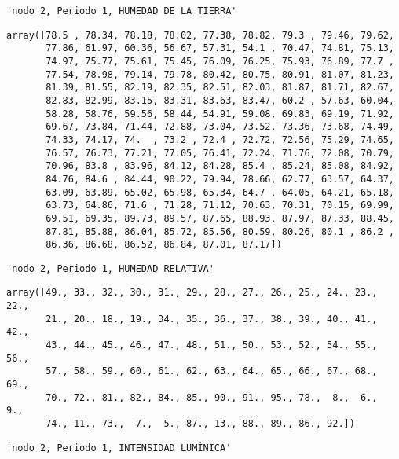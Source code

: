 \documentclass[11pt]{article}
\begin{document}
    
    \begin{verbatim}
'nodo 2, Periodo 1, HUMEDAD DE LA TIERRA'
    \end{verbatim}

    
    
    \begin{verbatim}
array([78.5 , 78.34, 78.18, 78.02, 77.38, 78.82, 79.3 , 79.46, 79.62,
       77.86, 61.97, 60.36, 56.67, 57.31, 54.1 , 70.47, 74.81, 75.13,
       74.97, 75.77, 75.61, 75.45, 76.09, 76.25, 75.93, 76.89, 77.7 ,
       77.54, 78.98, 79.14, 79.78, 80.42, 80.75, 80.91, 81.07, 81.23,
       81.39, 81.55, 82.19, 82.35, 82.51, 82.03, 81.87, 81.71, 82.67,
       82.83, 82.99, 83.15, 83.31, 83.63, 83.47, 60.2 , 57.63, 60.04,
       58.28, 58.76, 59.56, 58.44, 54.91, 59.08, 69.83, 69.19, 71.92,
       69.67, 73.84, 71.44, 72.88, 73.04, 73.52, 73.36, 73.68, 74.49,
       74.33, 74.17, 74.  , 73.2 , 72.4 , 72.72, 72.56, 75.29, 74.65,
       76.57, 76.73, 77.21, 77.05, 76.41, 72.24, 71.76, 72.08, 70.79,
       70.96, 83.8 , 83.96, 84.12, 84.28, 85.4 , 85.24, 85.08, 84.92,
       84.76, 84.6 , 84.44, 90.22, 79.94, 78.66, 62.77, 63.57, 64.37,
       63.09, 63.89, 65.02, 65.98, 65.34, 64.7 , 64.05, 64.21, 65.18,
       63.73, 64.86, 71.6 , 71.28, 71.12, 70.63, 70.31, 70.15, 69.99,
       69.51, 69.35, 89.73, 89.57, 87.65, 88.93, 87.97, 87.33, 88.45,
       87.81, 85.88, 86.04, 85.72, 85.56, 80.59, 80.26, 80.1 , 86.2 ,
       86.36, 86.68, 86.52, 86.84, 87.01, 87.17])
    \end{verbatim}

    
    
    \begin{verbatim}
'nodo 2, Periodo 1, HUMEDAD RELATIVA'
    \end{verbatim}

    
    
    \begin{verbatim}
array([49., 33., 32., 30., 31., 29., 28., 27., 26., 25., 24., 23., 22.,
       21., 20., 18., 19., 34., 35., 36., 37., 38., 39., 40., 41., 42.,
       43., 44., 45., 46., 47., 48., 51., 50., 53., 52., 54., 55., 56.,
       57., 58., 59., 60., 61., 62., 63., 64., 65., 66., 67., 68., 69.,
       70., 72., 81., 82., 84., 85., 90., 91., 95., 78.,  8.,  6.,  9.,
       74., 11., 73.,  7.,  5., 87., 13., 88., 89., 86., 92.])
    \end{verbatim}

    
    
    \begin{verbatim}
'nodo 2, Periodo 1, INTENSIDAD LUMÍNICA'
    \end{verbatim}
\end{document}
